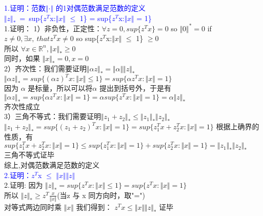 \documentclass{article}
\begin{document}
\textcolor{blue}{1.证明：范数$\Vert · \Vert$ 的1对偶范数满足范数的定义\\
$\Vert z \Vert_*$\, = \,sup\{$z^T$x:$\Vert x \Vert$ $\leq$ 1\} = sup\{$z^T$x:$\Vert x \Vert$ = 1\}}\\
1.证明：
1）非负性，正定性：$\forall z = 0, sup\{z^T x\} = 0 $ so $\Vert 0 \Vert^* = 0 $
if $z \neq 0, \exists x ,\ that z^T x \neq 0$ so sup\{$z^T$x:$\Vert x \Vert$ $\leq$ 1\} $\geq 0$\\
所以 $\forall x \in \mathbb{R}^n, \Vert x \Vert_* \geq 0 $\\
同时，如果 $\Vert x \Vert_* = 0, x = 0$\\
2）齐次性：我们需要证明$\Vert \alpha z \Vert_* = \Vert \alpha \Vert \Vert z \Vert_*$\\
$\Vert \alpha z \Vert_* = sup\{(\alpha z)^T x:\Vert x \Vert \leq 1\} = sup\{\alpha z^Tx:\Vert x \Vert = 1\}$\\
因为 $\alpha$ 是标量，所以可以将$\alpha$ 提出到括号外，于是有\\
$\Vert \alpha z \Vert_* = sup\{\alpha z^Tx:\Vert x \Vert = 1\} = \alpha sup\{ z^Tx:\Vert x \Vert = 1\} = \alpha \Vert z \Vert_*$\\
齐次性成立\\
3）三角不等式：我们需要证明$\Vert z_1 + z_2 \Vert_* \leq \Vert z_1 \Vert_* \Vert z_2 \Vert_*$\\
$\Vert z_1 + z_2 \Vert_* = sup\{ (z_1+z_2)^Tx:\Vert x \Vert = 1\} =  sup\{ z_1^T x +z_2^T x:\Vert x \Vert = 1\}$
根据上确界的性质，有$sup\{ z_1^T x +z_2^T x:\Vert x \Vert = 1\} \leq sup\{ z_1^T x:\Vert x \Vert = 1\} + sup\{z_2^T x:\Vert x \Vert = 1\} = \Vert z_1 \Vert_* \Vert z_2 \Vert_*$\\
三角不等式证毕\\
综上,对偶范数满足范数的定义\\
\textcolor{blue}{2.证明：$z^T$x $\leq$ $\Vert x \Vert$$\Vert z \Vert$}\\
2.证明:
因为 $\Vert z \Vert_* = sup\{z^Tx:\Vert x \Vert \leq 1\} = sup\{z^Tx:\Vert x \Vert = 1\}$\\
所以 $\Vert z \Vert_* \geq z^T \frac{x}{\Vert x \Vert}$(当z 与 x 同方向时，取"=")\\
对等式两边同时乘 $\Vert x \Vert$ 我们得到： $z^T x \leq  \Vert x \Vert \Vert z \Vert_*$ 
证毕
\end{document}
